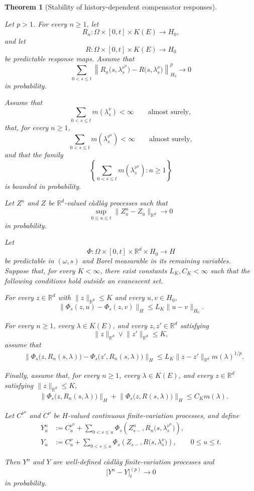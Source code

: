 \documentclass[a4paper,10pt]{article}
\newtheorem{thm}{Theorem}[section]
\begin{document}
\begin{thm}
[Stability of history-dependent compensator responses]
\label{thm:history-dependent-response-stability}

Let \(p>1\). For every \(n\ge1\), let
\[
R_n:
\Omega\times[0,t]\times K(E)
\longrightarrow H_0,
\]
and let
\[
R:
\Omega\times[0,t]\times K(E)
\longrightarrow H_0
\]
be predictable response maps. Assume that
\[
\sum_{0<s\le t}
\left\lVert
R_n\bigl(s,\lambda_s^{\nu^n}\bigr)
-
R\bigl(s,\lambda_s^\nu\bigr)
\right\rVert_{H_0}^p
\longrightarrow0
\]
in probability.

Assume that
\[
\sum_{0<s\le t}m(\lambda_s^\nu)<\infty
\qquad\text{almost surely},
\]
that, for every \(n\ge1\),
\[
\sum_{0<s\le t}m(\lambda_s^{\nu^n})<\infty
\qquad\text{almost surely},
\]
and that the family
\[
\left\{
\sum_{0<s\le t}m(\lambda_s^{\nu^n})
:n\ge1
\right\}
\]
is bounded in probability.

Let \(Z^n\) and \(Z\) be \(\mathbb R^d\)-valued càdlàg processes such
that
\[
\sup_{0\le u\le t}
\lVert Z_u^n-Z_u\rVert_{\mathbb R^d}
\longrightarrow0
\]
in probability.

Let
\[
\Phi:
\Omega\times[0,t]\times\mathbb R^d\times H_0
\longrightarrow H
\]
be predictable in \((\omega,s)\) and Borel measurable in its remaining
variables. Suppose that, for every \(K<\infty\), there exist constants
\(L_K,C_K<\infty\) such that the following conditions hold outside an
evanescent set.

For every \(z\in\mathbb R^d\) with \(\lVert z\rVert_{\mathbb R^d}\le K\)
and every \(u,v\in H_0\),
\[
\lVert
\Phi_s(z,u)-\Phi_s(z,v)
\rVert_H
\le
L_K\lVert u-v\rVert_{H_0}.
\]

For every \(n\ge1\), every \(\lambda\in K(E)\), and every
\(z,z'\in\mathbb R^d\) satisfying
\[
\lVert z\rVert_{\mathbb R^d}
\vee
\lVert z'\rVert_{\mathbb R^d}
\le K,
\]
assume that
\[
\begin{aligned}
&\lVert
\Phi_s\bigl(z,R_n(s,\lambda)\bigr)
-
\Phi_s\bigl(z',R_n(s,\lambda)\bigr)
\rVert_H
\le
L_K
\lVert z-z'\rVert_{\mathbb R^d}
m(\lambda)^{1/p}.
\end{aligned}
\]

Finally, assume that, for every \(n\ge1\), every
\(\lambda\in K(E)\), and every \(z\in\mathbb R^d\) satisfying
\(\lVert z\rVert_{\mathbb R^d}\le K\),
\[
\begin{aligned}
&\lVert
\Phi_s\bigl(z,R_n(s,\lambda)\bigr)
\rVert_H
+
\lVert
\Phi_s\bigl(z,R(s,\lambda)\bigr)
\rVert_H
\le
C_Km(\lambda).
\end{aligned}
\]

Let \(C^{\nu^n}\) and \(C^\nu\) be \(H\)-valued continuous
finite-variation processes, and define
\[
\begin{aligned}
Y_u^n
&:=
C_u^{\nu^n}
+
\sum_{0<s\le u}
\Phi_s\left(
Z_{s-}^n,
R_n\bigl(s,\lambda_s^{\nu^n}\bigr)
\right),
\\
Y_u
&:=
C_u^\nu
+
\sum_{0<s\le u}
\Phi_s\left(
Z_{s-},
R\bigl(s,\lambda_s^\nu\bigr)
\right),
\qquad 0\le u\le t.
\end{aligned}
\]

Then \(Y^n\) and \(Y\) are well-defined càdlàg finite-variation
processes and
\[
        \bigl[Y^n-Y\bigr]^{(p)}_t
        \longrightarrow0
\]
in probability.
\end{thm}
\end{document}
